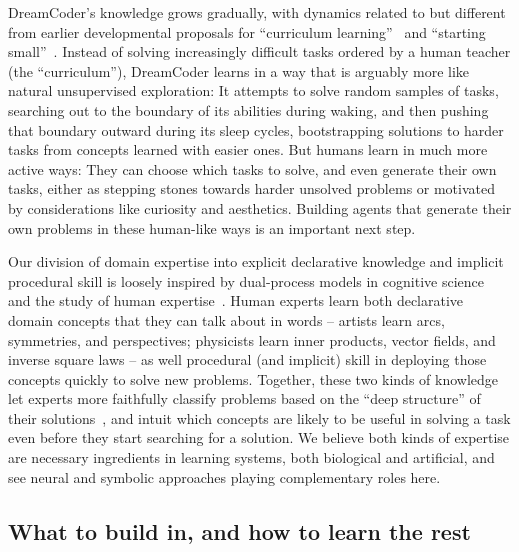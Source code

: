\documentclass[12pt]{article}
\begin{document}
DreamCoder's knowledge grows gradually, with dynamics 
related to but different from earlier developmental proposals for
``curriculum learning''~\cite{bengio2009curriculum} and ``starting small''~\cite{elman1993learning}.
Instead of solving increasingly difficult tasks ordered %
by a human teacher (the ``curriculum''), 
DreamCoder learns in a way that is arguably more like natural unsupervised exploration: It attempts to solve random samples of tasks, searching out to the boundary of its abilities during waking,
and then pushing that boundary outward during its sleep cycles,
bootstrapping solutions to harder tasks from concepts learned 
with easier ones.
But humans learn in much more active ways: They can choose which tasks to solve,
and even generate their own tasks, 
either as stepping stones towards harder unsolved problems or motivated by considerations like curiosity and aesthetics.
Building agents that generate their own problems in these human-like ways is an important next step.

Our division of domain expertise into explicit declarative knowledge and implicit procedural skill is loosely inspired by dual-process models in cognitive science~\cite{evans1984heuristic,kahneman2011thinking} and the study of human expertise~\cite{chi1981categorization,chi1988nature}. Human experts learn both declarative domain concepts that they can talk about in words -- artists learn arcs, symmetries, and perspectives; physicists learn inner products, vector fields, and inverse square laws -- as well procedural (and implicit) skill in deploying those concepts quickly to solve new problems.
Together, these two kinds of knowledge let experts more faithfully classify problems based on the ``deep structure'' of their solutions~\cite{chi1981categorization,chi1988nature}, and intuit which concepts are likely to be useful in solving a task even before they start searching for a solution.
We believe both kinds of expertise are necessary ingredients in learning systems, both biological and artificial, and see neural and symbolic approaches playing complementary roles here.

\subsection*{What to build in, and how to learn the rest}
\end{document}
